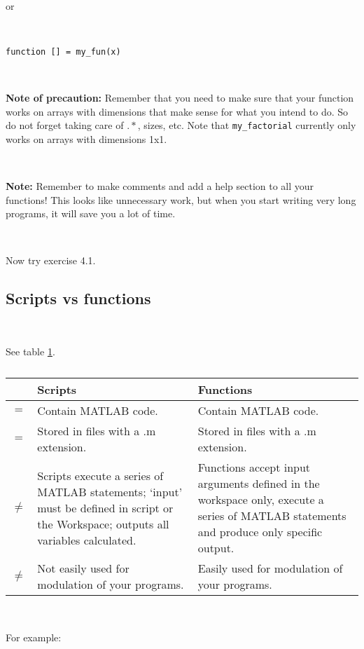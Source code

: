 \documentclass[11pt]{amsart}
\begin{document}
\

or 

\

\color{blue}
\begin{verbatim}
function [] = my_fun(x)
 \end{verbatim}
\color{black}

\

{\bf Note of precaution:} Remember that you need to make sure that your function works on arrays with dimensions that make sense for what you intend to do. So do not forget taking care of $.*$, sizes, etc. Note that \verb+my_factorial+ currently only works on arrays with dimensions 1x1.
 
 \
 
{\bf Note:} Remember to make comments and add a help section to all your functions! This looks like unnecessary work, but when you start writing very long programs, it will save you a lot of time.

\

Now try exercise 4.1.

\subsection{Scripts vs functions}

\

See table \ref{tableA}.

\begin{table}[h!]
\caption{}
\label{tableA}
\begin{tabular}{|c|p{7cm}|p{7cm}|}
\hline
 & {\bf Scripts} & {\bf Functions}\\\hline
$=$ & Contain MATLAB code. & Contain MATLAB code.\\\hline
$=$ & Stored in files with a .m extension. & Stored in files with a .m extension.\\\hline
$\neq$ & Scripts execute a series of MATLAB statements; `input' must be defined in script or the Workspace; outputs all variables calculated. & Functions accept input arguments defined in the workspace only, execute a series of MATLAB statements and produce only specific output. \\\hline
$\neq$ & Not easily used for modulation of your programs. & Easily used for modulation of your programs.\\\hline
\end{tabular}
\end{table}

\

For example:
\end{document}

